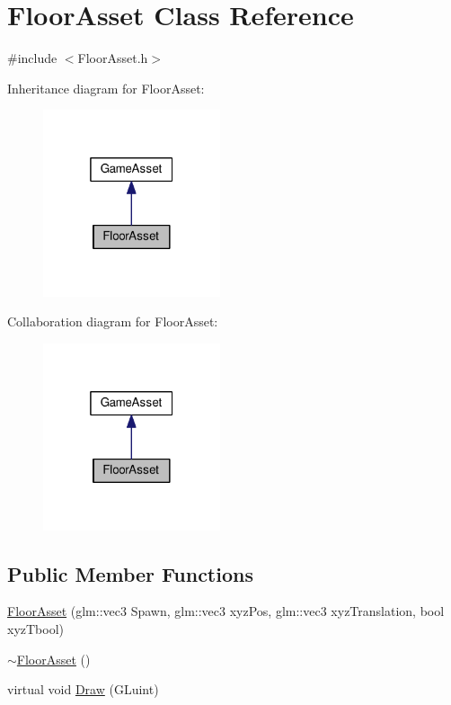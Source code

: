 \hypertarget{class_floor_asset}{}\section{Floor\+Asset Class Reference}
\label{class_floor_asset}


{\ttfamily \#include $<$Floor\+Asset.\+h$>$}



Inheritance diagram for Floor\+Asset\+:\nopagebreak
\begin{figure}[H]
\begin{center}
\leavevmode
\includegraphics[width=148pt]{class_floor_asset__inherit__graph}
\end{center}
\end{figure}


Collaboration diagram for Floor\+Asset\+:\nopagebreak
\begin{figure}[H]
\begin{center}
\leavevmode
\includegraphics[width=148pt]{class_floor_asset__coll__graph}
\end{center}
\end{figure}
\subsection*{Public Member Functions}
\begin{DoxyCompactItemize}
\item 
\hyperlink{class_floor_asset_a4b8e3fb6415ed1126c9243267c7195a8}{Floor\+Asset} (glm\+::vec3 Spawn, glm\+::vec3 xyz\+Pos, glm\+::vec3 xyz\+Translation, bool xyz\+Tbool)
\item 
\hyperlink{class_floor_asset_a7d782882bb08ee2a2285821275383856}{$\sim$\+Floor\+Asset} ()
\item 
virtual void \hyperlink{class_floor_asset_a14650eb2c2cd75e990c351bad8636279}{Draw} (G\+Luint)
\end{DoxyCompactItemize}


